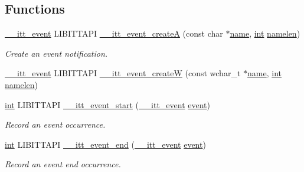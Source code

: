 \subsection*{Functions}
\begin{DoxyCompactItemize}
\item 
\hyperlink{group__legacy__events_gaf3abb988e507916595fa4a13f5a524e4}{\-\_\-\-\_\-itt\-\_\-event} L\-I\-B\-I\-T\-T\-A\-P\-I \hyperlink{group__legacy__events_ga6de94d8c80ce1289fc90a4d4154e4538}{\-\_\-\-\_\-itt\-\_\-event\-\_\-create\-A} (const char $\ast$\hyperlink{ittnotify__static_8h_a1c34b35a4952969fef60192313bba34a}{name}, \hyperlink{ittnotify__static_8h_a8b8dcd723308a8cb5d84277c7a3fff70}{int} \hyperlink{ittnotify__static_8h_ad09d4488ac9ab9e8311005b45b81f4f2}{namelen})
\begin{DoxyCompactList}\small\item\em Create an event notification. \end{DoxyCompactList}\item 
\hyperlink{group__legacy__events_gaf3abb988e507916595fa4a13f5a524e4}{\-\_\-\-\_\-itt\-\_\-event} L\-I\-B\-I\-T\-T\-A\-P\-I \hyperlink{group__legacy__events_ga656b8b44d98d21f42cdb179f6da343c6}{\-\_\-\-\_\-itt\-\_\-event\-\_\-create\-W} (const wchar\-\_\-t $\ast$\hyperlink{ittnotify__static_8h_a1c34b35a4952969fef60192313bba34a}{name}, \hyperlink{ittnotify__static_8h_a8b8dcd723308a8cb5d84277c7a3fff70}{int} \hyperlink{ittnotify__static_8h_ad09d4488ac9ab9e8311005b45b81f4f2}{namelen})
\item 
\hyperlink{ittnotify__static_8h_a8b8dcd723308a8cb5d84277c7a3fff70}{int} L\-I\-B\-I\-T\-T\-A\-P\-I \hyperlink{group__legacy__events_gaa8d6914227075c6a03e18a17e0d0749c}{\-\_\-\-\_\-itt\-\_\-event\-\_\-start} (\hyperlink{group__legacy__events_gaf3abb988e507916595fa4a13f5a524e4}{\-\_\-\-\_\-itt\-\_\-event} \hyperlink{ittnotify__static_8h_a67bfbc8333e927ea068b74b6176097f2}{event})
\begin{DoxyCompactList}\small\item\em Record an event occurrence. \end{DoxyCompactList}\item 
\hyperlink{ittnotify__static_8h_a8b8dcd723308a8cb5d84277c7a3fff70}{int} L\-I\-B\-I\-T\-T\-A\-P\-I \hyperlink{group__legacy__events_ga652d494fbcc6c727e15cfb60af679816}{\-\_\-\-\_\-itt\-\_\-event\-\_\-end} (\hyperlink{group__legacy__events_gaf3abb988e507916595fa4a13f5a524e4}{\-\_\-\-\_\-itt\-\_\-event} \hyperlink{ittnotify__static_8h_a67bfbc8333e927ea068b74b6176097f2}{event})
\begin{DoxyCompactList}\small\item\em Record an event end occurrence. \end{DoxyCompactList}\end{DoxyCompactItemize}


